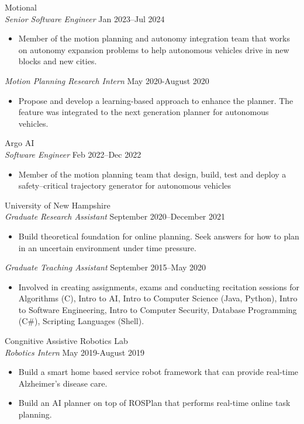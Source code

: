 \documentclass[margin, 10pt]{res} %
\begin{document}
\begin{resume}
{\sc Motional}\\
{\sl Senior Software Engineer} \hfill Jan 2023--Jul 2024
\begin{itemize}
	\item Member of the motion planning and autonomy integration team that works on autonomy expansion problems to help autonomous vehicles drive in new blocks and new cities.
\end{itemize}
{\sl Motion Planning Research Intern} \hfill May 2020-August 2020
\begin{itemize}
	\item Propose and develop a learning-based approach to enhance the planner. The feature was integrated to the next generation planner for autonomous vehicles.
\end{itemize}

{\sc Argo AI}\\
{\sl Software Engineer \MakeUppercase{}} \hfill Feb 2022--Dec 2022
\begin{itemize}
	\item Member of the motion planning team that design, build, test and deploy a safety--critical trajectory generator for autonomous vehicles
\end{itemize}

{\sc University of New Hampshire}\\
{\sl Graduate Research Assistant} \hfill September 2020--December 2021
\begin{itemize}
\item Build theoretical foundation for online planning. Seek answers for how to plan in an uncertain environment under time pressure.
\end{itemize}
{\sl Graduate Teaching Assistant} \hfill September 2015--May 2020
\begin{itemize}
\item Involved in creating assignments, exams and
		conducting recitation sessions for Algorithms (C), Intro to AI, Intro to
            Computer Science (Java, Python), Intro to Software Engineering, Intro to
		Computer Security, Database Programming (C\#), Scripting Languages (Shell).
\end{itemize}

{\sc Congnitive Assistive Robotics Lab}\\
{\sl Robotics Intern} \hfill May 2019-August 2019
\begin{itemize}
	\item Build a smart home based service robot framework that
					can provide real-time Alzheimer's disease care.
	\item Build an AI planner on top of ROSPlan that performs
					real-time online task planning.
\end{itemize}


\end{resume}
\end{document}
